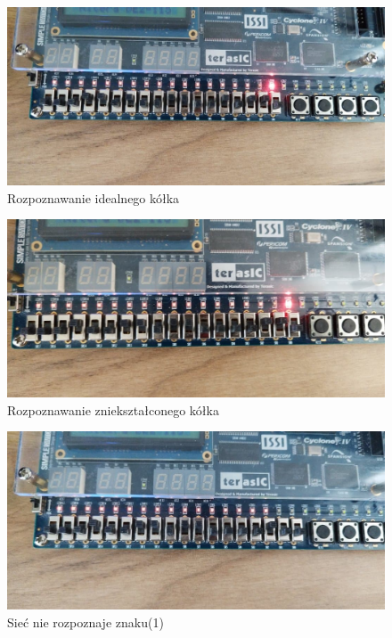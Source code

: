 \documentclass[a4paper, titleauthor]{mwart}
\begin{document}
\begin{figure}[h!]
    \centering
    \includegraphics[width = \textwidth, height = 0.6\textwidth]{idealne_kółko.jpg}
    \caption{Rozpoznawanie idealnego kółka}
    \label{fig:enter-label}
\end{figure}
\begin{figure}[h!]
    \centering
    \includegraphics[width = \textwidth, height = 0.6\textwidth]{zniekształcone_kółko.jpg}
    \caption{Rozpoznawanie zniekształconego kółka}
    \label{fig:enter-label}
\end{figure}
\begin{figure}[h!]
    \centering
    \includegraphics[width = \textwidth, height = 0.6\textwidth]{nic1.jpg}
    \caption{Sieć nie rozpoznaje znaku(1)}
    \label{fig:enter-label}
\end{figure}
\end{document}
